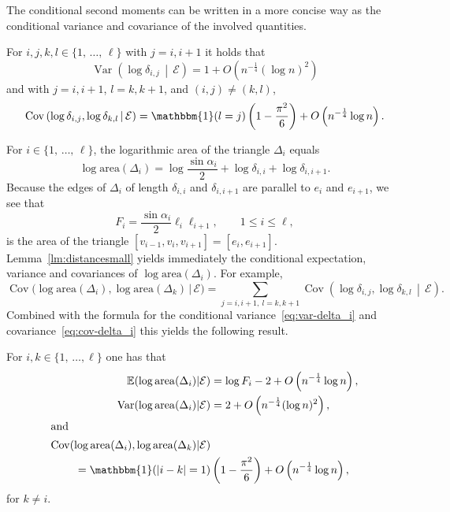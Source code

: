 \documentclass[AHL,Unicode,longabstracts,published]{cedram}
\newcommand{\ind}{\mathbbm{1}}
\newcommand{\var}{\operatorname{Var}}
\newcommand{\cov}{\operatorname{Cov}}
\newcommand{\bbE}{\mathbb{E}}
\newcommand{\clE}{\mathcal{E}}
\newcommand{\area}{\mathrm{area}}
\begin{document}
The conditional second moments can be written in a more concise way as the conditional variance and covariance of the involved quantities.
\begin{coro}
For $i,j,k,l\in\{1,\,\ldots,\,\ell\}$ with $j=i,i+1$ it holds that
\begin{equation}\label{eq:var-delta_i}
\var \left(\log \delta_{i,j}\,\middle|\,\clE\right) = 1 + O\left(n^{- \frac 14} (\log n)^2\right)
\end{equation}
and with $j=i,i+1$, $l=k,k+1$, and $(i,j) \neq (k,l)$,
\begin{equation}\label{eq:cov-delta_i}
\cov \left(\log \delta_{i,j}, \log \delta_{k,l}\,\middle|\,\clE\right) =
\ind(l=j)\left(1-\frac{\pi^2}6\right) + O\left(n^{- \frac 14} \log n\right).
\end{equation}
\end{coro}

For $i\in\{1,\,\ldots,\,\ell\}$, the logarithmic area of the triangle $\Delta_i$ equals
\[
\log {\area}(\Delta_i) =
\log \frac{\sin \alpha_i}2 + \log \delta_{i,i} + \log \delta_{i,i+1}.
\]
Because the edges of $\Delta_i$ of length $\delta_{i,i}$ and $\delta_{i,i+1}$ are parallel to $e_i$ and $e_{i+1}$, we see that
\[
F_i= \frac{\sin \alpha_i}2 \ell_i \ell_{i+1},\qquad 1\leq i\leq \ell,
\]
is the area of the triangle $[v_{i-1}, v_i, v_{i+1}]=[e_i, e_{i+1}]$. Lemma~\ref{lm:distancesmall} yields immediately the conditional expectation, variance and covariances of $\log{\area}(\Delta_i)$. For example,
\[
\cov \big(\log {\area}(\Delta_i), \log {\area} (\Delta_k)\,\big|\,\clE\big) =
\sum_{j=i, i+1,\ l=k, k+1} \cov \left(\log \delta_{i,j}, \log \delta_{k,l}\, \middle|\,\clE\right).
\]
Combined with the formula for the conditional variance~\eqref{eq:var-delta_i} and covariance~\eqref{eq:cov-delta_i} this yields the following result.

\begin{coro}\label{cor:moments-logarea}
For $i,k\in\{1,\,\ldots,\ell\}$ one has that
\begin{align}
\bbE (\log {\area} (\Delta_i)|\clE) &= \log F_i -2 + O\left(n^{- \frac 14} \log n\right),\label{eq:E-log-area} \\
\var (\log {\area} (\Delta_i) |\clE) &= 2+ O\left(n^{- \frac 14} (\log n)^2\right),\label{eq:Var-log-area}\\
\intertext{and}
\cov (\log {\area}(\Delta_i), \log {\area} (\Delta_k) |\clE) &\label{eq:Covar-log-area}\\
=\ind(|i-k|=1) &\left(1 - \frac{\pi^2}6 \right) + O\left(n^{- \frac 14} \log n\right),\nonumber
\end{align}
for $k\neq i$.
\end{coro}
\end{document}
